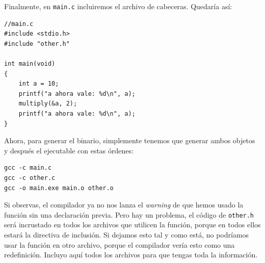 \documentclass[a4paper]{article}
\begin{document}
Finalmente, en \verb!main.c! incluiremos el archivo de cabeceras. Quedaría así:

\noindent
\begin{minipage}[H]{\linewidth}
\mbox{}
\begin{lstlisting}[style=C,
caption={Archivo principal con cabeceras incluidas},
label={lst:fileCofHeader}]
//main.c
#include <stdio.h>
#include "other.h"

int main(void)
{
    int a = 10;
    printf("a ahora vale: %d\n", a);
    multiply(&a, 2);
    printf("a ahora vale: %d\n", a);
}
\end{lstlisting}
\end{minipage}

Ahora, para generar el binario, simplemente tenemos que generar ambos
objetos y después el ejecutable con estas órdenes:

\noindent
\begin{minipage}[H]{\linewidth}
\mbox{}
\begin{lstlisting}[style=terminalStyle]
gcc -c main.c
gcc -c other.c
gcc -o main.exe main.o other.o
\end{lstlisting}
\end{minipage}

Si observas, el compilador ya no nos lanza el \emph{warning} de que hemos
usado la función sin una declaración previa. Pero hay un problema, el código
de \verb!other.h! será incrustado en todos los archivos que utilicen la función,
porque en todos ellos estará la directiva de inclusión. Si dejamos esto tal y
como está, no podríamos usar la función en otro archivo, porque el compilador
vería esto como una redefinición. Incluyo aquí todos los archivos para que
tengas toda la información.
\end{document}
